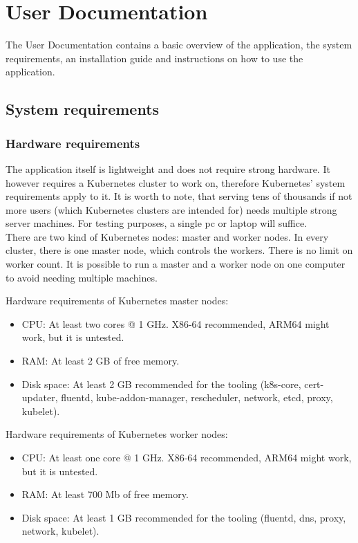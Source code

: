 \chapter{User Documentation} %
\label{ch:user}

The User Documentation contains a basic overview of the application, the system requirements, an installation guide and instructions on how to use the application.

\section{System requirements}
\subsection{Hardware requirements}
The application itself is lightweight and does not require strong hardware. It however requires a Kubernetes cluster to work on, therefore Kubernetes' system requirements apply to it. It is worth to note, that serving tens of thousands if not more users (which Kubernetes clusters are intended for) needs multiple strong server machines. For testing purposes, a single pc or laptop will suffice. \\

There are two kind of Kubernetes nodes: master and worker nodes. In every cluster, there is one master node, which controls the workers. There is no limit on worker count. It is possible to run a master and a worker node on one computer to avoid needing multiple machines.
\bigbreak

\newpage
\noindent
Hardware requirements of Kubernetes master nodes:
\begin{itemize}
	\item CPU: At least two cores @ 1 GHz. X86-64 recommended, ARM64 might work, but it is untested. 
	\item RAM: At least 2 GB of free memory.
	\item Disk space: At least 2 GB recommended for the tooling (k8s-core, cert-updater, fluentd, kube-addon-manager, rescheduler, network, etcd, proxy, kubelet).
\end{itemize}

\noindent
Hardware requirements of Kubernetes worker nodes:
\begin{itemize}
	\item CPU: At least one core @ 1 GHz. X86-64 recommended, ARM64 might work, but it is untested. 
	\item RAM: At least 700 Mb of free memory.
	\item Disk space: At least 1 GB recommended for the tooling (fluentd, dns, proxy, network, kubelet).
\end{itemize}

